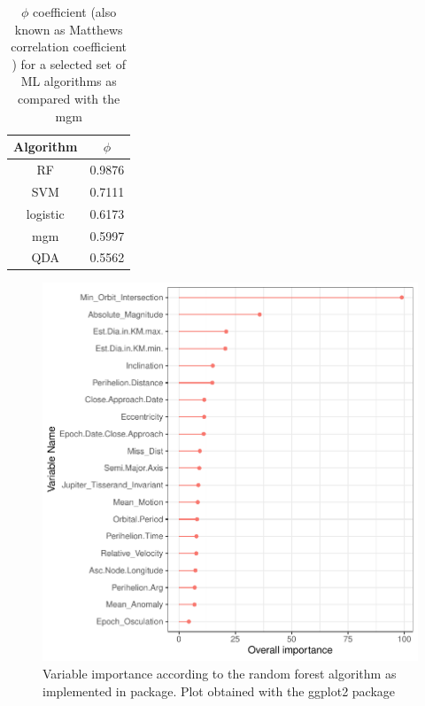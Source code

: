 \documentclass[12pt,%
               a4paper,%
               oneside,openany,%
               titlepage,%
               headinclude,footinclude,%
               BCOR5mm,%
               cleardoublepage=empty,%
               tablecaptionabove,%
               floatperchapter,
               ]{scrreprt}                 %
\begin{document}
\begin{table}[]
\caption{$\phi$ coefficient (also known as Matthews correlation coefficient ) for a selected set of ML algorithms as compared with the mgm}
\begin{center}
\begin{tabular}{c|c}
Algorithm & $\phi$ \\ \hline
RF        & 0.9876 \\ \hline
SVM       & 0.7111 \\ \hline
logistic  & 0.6173 \\ \hline
mgm       & 0.5997 \\ \hline
QDA       & 0.5562 
\end{tabular}
\end{center}
\label{phi_values}
\end{table}

\begin{figure}[h]
\begin{center}
\includegraphics[width=1\textwidth]{Figures/RF_Importance.pdf}
\caption{Variable importance according to the random forest algorithm as implemented in \cite{rfor} package. Plot obtained with the ggplot2 package \cite{ggplot2}}
\label{RF_Importance}
\end{center}
\end{figure}
\end{document}
